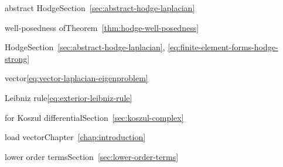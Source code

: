 \par\noindent\hspace*{1em}\label{index:laplacian-abstract-hodge}{abstract Hodge}\quad Section~\ref{sec:abstract-hodge-laplacian}

\par\noindent\hspace*{2em}\label{index:laplacian-abstract-hodge-well-posedness-of}{well-posedness of}\quad Theorem~\ref{thm:hodge-well-posedness}

\par\noindent\hspace*{1em}\label{index:laplacian-hodge}{Hodge}\quad Section~\ref{sec:abstract-hodge-laplacian}, \eqref{eq:finite-element-forms-hodge-strong}

\par\noindent\hspace*{1em}\label{index:laplacian-vector}{vector}\quad \eqref{eq:vector-laplacian-eigenproblem}

\par\noindent\hspace*{0em}\label{index:leibniz-rule}{Leibniz rule}\quad \eqref{eq:exterior-leibniz-rule}

\par\noindent\hspace*{1em}\label{index:leibniz-rule-for-koszul-differential}{for Koszul differential}\quad Section~\ref{sec:koszul-complex}

\par\noindent\hspace*{0em}\label{index:load-vector}{load vector}\quad Chapter~\ref{chap:introduction}

\par\noindent\hspace*{0em}\label{index:lower-order-terms}{lower order terms}\quad Section~\ref{sec:lower-order-terms}

